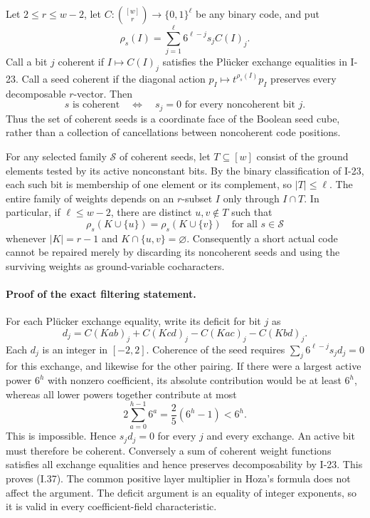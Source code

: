 \documentclass[11pt,a4paper]{article}
\theoremstyle{definition}\newtheorem{definition}{Definition}
\begin{document}
Let $2\le r\le w-2$, let
$C:\binom{[w]}r\longrightarrow\{0,1\}^{\ell}$ be any binary
code, and put
\[
 \rho_s(I)=\sum_{j=1}^{\ell}6^{\ell-j}s_j C(I)_j.
 \tag{I.36}
\]
Call a bit $j$ coherent if $I\mapsto C(I)_j$ satisfies the
Pl\"ucker exchange equalities in I-23.  Call a seed coherent
if the diagonal action $p_I\mapsto t^{\rho_s(I)}p_I$
preserves every decomposable $r$-vector.
Then
\[
 s\text{ is coherent}
 \quad\Longleftrightarrow\quad
 s_j=0\text{ for every noncoherent bit }j.
 \tag{I.37}
\]
Thus the set of coherent seeds is a coordinate face of the
Boolean seed cube, rather than a collection of cancellations
between noncoherent code positions.

For any selected family $\mathcal S$ of coherent seeds, let
$T\subseteq[w]$ consist of the ground elements tested by its
active nonconstant bits.  By the binary classification of I-23,
each such bit is membership of one element or its complement,
so $|T|\le\ell$.  The entire family of weights depends on an
$r$-subset $I$ only through $I\cap T$.  In particular, if
$\ell\le w-2$, there are distinct $u,v\notin T$ such that
\[
 \rho_s(K\cup\{u\})=\rho_s(K\cup\{v\})
 \quad\text{for all }s\in\mathcal S
 \tag{I.38}
\]
whenever $|K|=r-1$ and $K\cap\{u,v\}=\varnothing$.
Consequently a short actual code cannot be repaired merely
by discarding its noncoherent seeds and using the surviving
weights as ground-variable cocharacters.

\paragraph{Proof of the exact filtering statement.}
For each Pl\"ucker exchange equality, write its deficit for
bit $j$ as
\[
 d_j=C(Kab)_j+C(Kcd)_j-C(Kac)_j-C(Kbd)_j.
\]
Each $d_j$ is an integer in $[-2,2]$.  Coherence of the seed
requires $\sum_j 6^{\ell-j}s_jd_j=0$ for this exchange,
and likewise for the other pairing.  If there were a largest
active power $6^h$ with nonzero coefficient, its absolute
contribution would be at least $6^h$, whereas all lower
powers together contribute at most
\[
 2\sum_{a=0}^{h-1}6^a
   =\frac25(6^h-1)<6^h.
\]
This is impossible.  Hence $s_jd_j=0$ for every $j$ and
every exchange.  An active bit must therefore be coherent.
Conversely a sum of coherent weight functions satisfies all
exchange equalities and hence preserves decomposability by
I-23.  This proves (I.37).  The common positive layer
multiplier in Hoza's formula does not affect the argument.
The deficit argument is an equality of integer exponents,
so it is valid in every coefficient-field characteristic.
\end{document}
